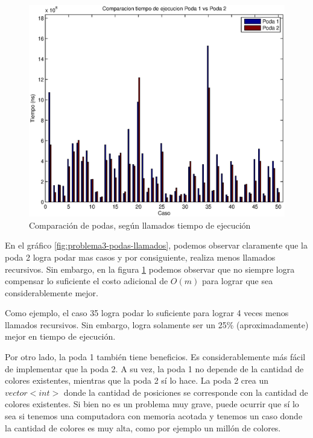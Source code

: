 \begin{center}
  \begin{figure}[H]
\includegraphics[width=\linewidth]{problema3/graficos/comparacion_podas1y2_tiempo.eps}
    \caption{Comparación de podas, según llamados tiempo de ejecución}
    \label{fig:problema3-podas-tiempo}
  \end{figure}
\end{center}


En el gráfico \ref{fig:problema3-podas-llamados}, podemos observar claramente que la poda 2 logra podar mas casos y por consiguiente, realiza menos llamados recursivos. Sin embargo, en la figura \ref{fig:problema3-podas-tiempo} podemos observar que no siempre logra compensar lo suficiente el costo adicional de $O(m)$ para lograr que sea considerablemente mejor.

Como ejemplo, el caso 35 logra podar lo suficiente para lograr 4 veces menos llamados recursivos. Sin embargo, logra solamente ser un 25\% (aproximadamente) mejor en tiempo de ejecución.

Por otro lado, la poda 1 también tiene beneficios. Es considerablemente más fácil de implementar que la poda 2. A su vez, la poda 1 no depende de la cantidad de colores existentes, mientras que la poda 2 sí lo hace. La poda 2 crea un $vector<int>$ donde la cantidad de posiciones se corresponde con la cantidad de colores existentes. Si bien no es un problema muy grave, puede ocurrir que sí lo sea si tenemos una computadora con memoria acotada y tenemos un caso donde la cantidad de colores es muy alta, como por ejemplo un millón de colores.